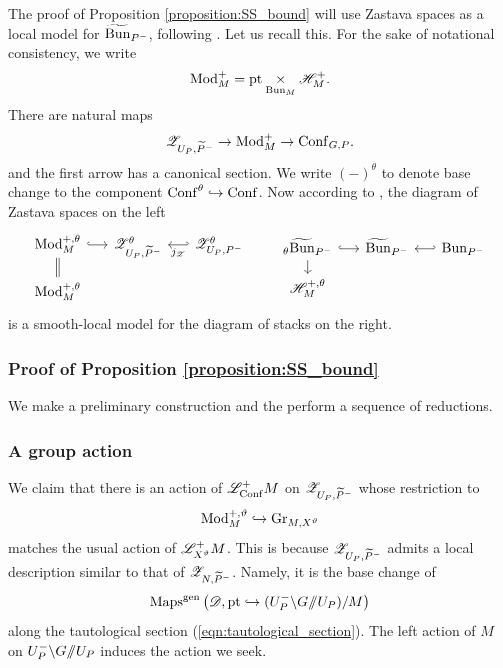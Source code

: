 \subsubsection{} The proof of Proposition \ref{proposition:SS_bound} will use Zastava spaces as a local model for $\widetilde{\mathrm{Bun}}_{P^-}$, following \cite{BFGM}. Let us recall this. For the sake of notational consistency, we write
    \[
    \mathrm{Mod}_M^+ = \mathrm{pt} \underset{\mathrm{Bun}_M}{\times} \mathscr{H}_M^+.
    \]
There are natural maps
    \[
    \mathscr{Z}_{U_P, \widetilde{P}^-} \to \mathrm{Mod}_M^+ \to \mathrm{Conf}_{G,P}.
    \]
and the first arrow has a canonical section. We write $(-)^\theta$ to denote base change to the component $\mathrm{Conf}^\theta \hookrightarrow \mathrm{Conf}$. Now according to \cite[(1)]{BFGM_erratum}, the diagram of Zastava spaces on the left
\[
\begin{tikzcd}[
  column sep={1.5em},
  row sep={1em}
]
  \Mod_M^{+,\theta} \arrow[r, hook] \arrow[d, equal] & \ZZ_{U_P, \Pt^-}^\theta & \ZZ_{U_P, P^-}^\theta \arrow[l, hook', "j_\ZZ"] \\
  \Mod_M^{+,\theta} & & 
\end{tikzcd}
\qquad 
\begin{tikzcd}[
  column sep={1.5em},
  row sep={1em}
]
  {}_{\theta}\Bunt_{P^-} \arrow[r, hook] \arrow[d] & \Bunt_{P^-} & \Bun_{P^-} \arrow[l, hook'] \\
  \HH_M^{+,\theta} & & 
\end{tikzcd}
\]
is a smooth-local model for the diagram of stacks on the right. 
\subsubsection{Proof of Proposition \ref{proposition:SS_bound}} We make a preliminary construction and the perform a sequence of reductions.

\subsubsection{A group action} We claim that there is an action of $\mathscr{L}_{\mathrm{Conf}}^+ M$ on $\mathscr{Z}_{U_P, \widetilde{P}^-}$ whose restriction to
    \[\mathrm{Mod}_M^{+, \vartheta} \hookrightarrow \mathrm{Gr}_{M, X^\vartheta}\]
matches the usual action of $\mathscr{L}_{X^\vartheta}^+ M$. This is because $\mathscr{Z}_{U_P, \widetilde{P}^-}$ admits a local description similar to that of $\mathscr{Z}_{N, \widetilde{P}^-}$. Namely, it is the base change of
    \[\mathrm{Maps}^{\mathrm{gen}}\left(\mathscr{D}, \mathrm{pt} \hookrightarrow (U_P^- \backslash G / \!\! / U_P) /M \right)\]
along the tautological section (\ref{eqn:tautological_section}). The left action of $M$ on $U_P^- \backslash G / \!\! / U_P$ induces the action we seek. 


